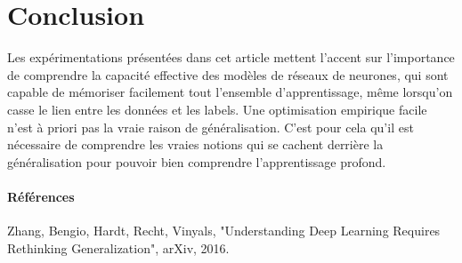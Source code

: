 \documentclass[a4paper,english,12pt]{article}
\begin{document}
\section{Conclusion} 
Les expérimentations présentées dans cet article mettent l’accent sur l’importance de comprendre la capacité effective des modèles
de réseaux de neurones, qui sont capable de mémoriser facilement tout l’ensemble d’apprentissage, même lorsqu'on casse le lien entre les données et les labels. Une optimisation empirique facile n'est à priori pas la vraie raison de généralisation. C’est pour cela qu’il est nécessaire de comprendre les vraies notions qui se cachent derrière la généralisation pour pouvoir bien comprendre l’apprentissage profond.

\paragraph{Références}
Zhang, Bengio, Hardt, Recht, Vinyals, "Understanding Deep Learning Requires Rethinking Generalization", arXiv, 2016. 
\end{document}
